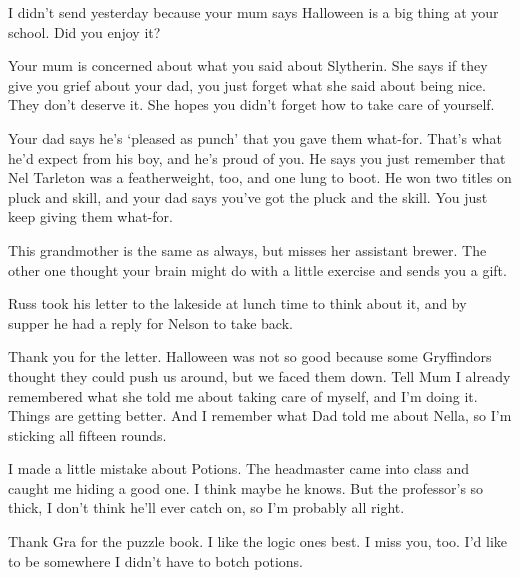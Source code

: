 \begin{writtenNote}


I didn't send yesterday because your mum says Halloween is a big thing at your school. Did you enjoy it?

Your mum is concerned about what you said about Slytherin. She says if they give you grief about your dad, you just forget what she said about being nice. They don't deserve it. She hopes you didn't forget how to take care of yourself.

Your dad says he's `pleased as punch' that you gave them what-for. That's what he'd expect from his boy, and he's proud of you. He says you just remember that Nel Tarleton was a featherweight, too, and one lung to boot. He won two titles on pluck and skill, and your dad says you've got the pluck and the skill. You just keep giving them what-for.

This grandmother is the same as always, but misses her assistant brewer. The other one thought your brain might do with a little exercise and sends you a gift.


\end{writtenNote}

Russ took his letter to the lakeside at lunch time to think about it, and by supper he had a reply for Nelson to take back.

\begin{writtenNote}


Thank you for the letter. Halloween was not so good because some Gryffindors thought they could push us around, but we faced them down. Tell Mum I already remembered what she told me about taking care of myself, and I'm doing it. Things are getting better. And I remember what Dad told me about Nella, so I'm sticking all fifteen rounds.

I made a little mistake about Potions. The headmaster came into class and caught me hiding a good one. I think maybe he knows. But the professor's so thick, I don't think he'll ever catch on, so I'm probably all right.

Thank Gra for the puzzle book. I like the logic ones best. I miss you, too. I'd like to be somewhere I didn't have to botch potions.


\end{writtenNote}

